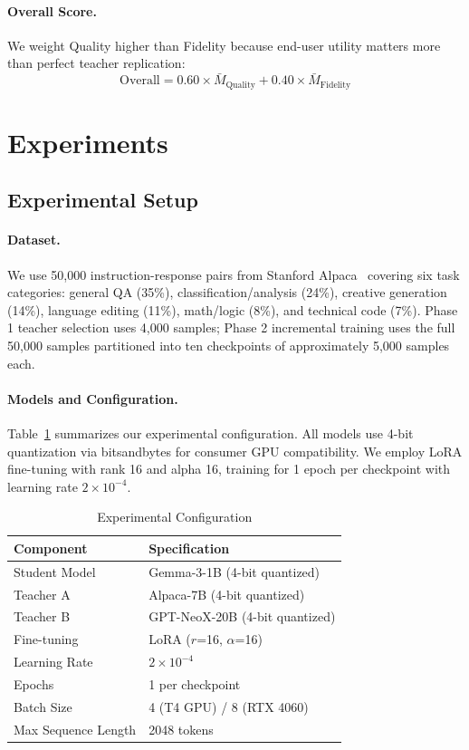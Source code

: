 \documentclass[sigconf]{acmart}
\begin{document}
\paragraph{Overall Score.}
We weight Quality higher than Fidelity because end-user utility matters more than perfect teacher replication:
\begin{equation}
\text{Overall} = 0.60 \times \bar{M}_{\text{Quality}} + 0.40 \times \bar{M}_{\text{Fidelity}}
\end{equation}

\section{Experiments}

\subsection{Experimental Setup}

\paragraph{Dataset.}
We use 50,000 instruction-response pairs from Stanford Alpaca~\cite{taori2023alpaca} covering six task categories: general QA (35\%), classification/analysis (24\%), creative generation (14\%), language editing (11\%), math/logic (8\%), and technical code (7\%). Phase 1 teacher selection uses 4,000 samples; Phase 2 incremental training uses the full 50,000 samples partitioned into ten checkpoints of approximately 5,000 samples each.

\paragraph{Models and Configuration.}
Table~\ref{tab:config} summarizes our experimental configuration. All models use 4-bit quantization via bitsandbytes for consumer GPU compatibility. We employ LoRA fine-tuning with rank 16 and alpha 16, training for 1 epoch per checkpoint with learning rate $2\times10^{-4}$.

\begin{table}[t]
\caption{Experimental Configuration}
\label{tab:config}
\centering
\small
\begin{tabular}{ll}
\toprule
\textbf{Component} & \textbf{Specification} \\
\midrule
Student Model & Gemma-3-1B (4-bit quantized) \\
Teacher A & Alpaca-7B (4-bit quantized) \\
Teacher B & GPT-NeoX-20B (4-bit quantized) \\
Fine-tuning & LoRA ($r$=16, $\alpha$=16) \\
Learning Rate & $2\times10^{-4}$ \\
Epochs & 1 per checkpoint \\
Batch Size & 4 (T4 GPU) / 8 (RTX 4060) \\
Max Sequence Length & 2048 tokens \\
\bottomrule
\end{tabular}
\end{table}
\end{document}
